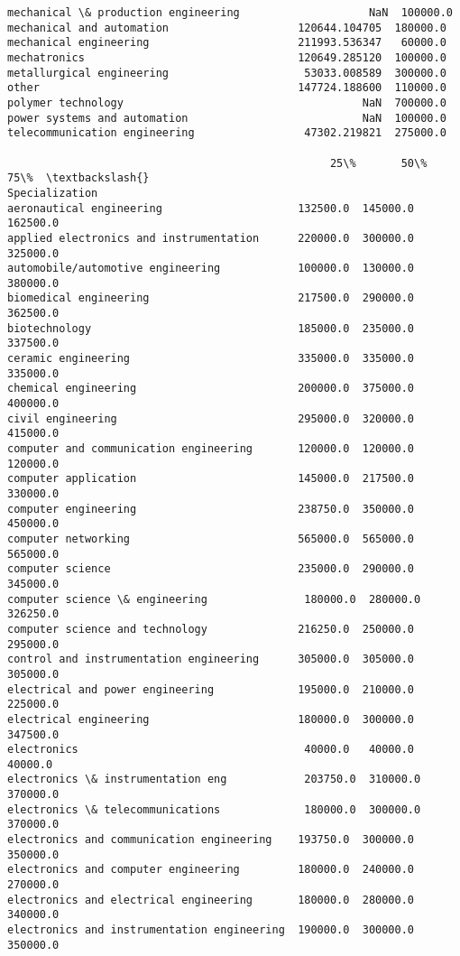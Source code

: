 \documentclass[11pt]{article}
\begin{document}
\begin{tcolorbox}[breakable, size=fbox, boxrule=.5pt, pad at break*=1mm, opacityfill=0]
\begin{Verbatim}[commandchars=\\\{\}]
mechanical \& production engineering                    NaN  100000.0
mechanical and automation                    120644.104705  180000.0
mechanical engineering                       211993.536347   60000.0
mechatronics                                 120649.285120  100000.0
metallurgical engineering                     53033.008589  300000.0
other                                        147724.188600  110000.0
polymer technology                                     NaN  700000.0
power systems and automation                           NaN  100000.0
telecommunication engineering                 47302.219821  275000.0

                                                  25\%       50\%       75\%  \textbackslash{}
Specialization
aeronautical engineering                     132500.0  145000.0  162500.0
applied electronics and instrumentation      220000.0  300000.0  325000.0
automobile/automotive engineering            100000.0  130000.0  380000.0
biomedical engineering                       217500.0  290000.0  362500.0
biotechnology                                185000.0  235000.0  337500.0
ceramic engineering                          335000.0  335000.0  335000.0
chemical engineering                         200000.0  375000.0  400000.0
civil engineering                            295000.0  320000.0  415000.0
computer and communication engineering       120000.0  120000.0  120000.0
computer application                         145000.0  217500.0  330000.0
computer engineering                         238750.0  350000.0  450000.0
computer networking                          565000.0  565000.0  565000.0
computer science                             235000.0  290000.0  345000.0
computer science \& engineering               180000.0  280000.0  326250.0
computer science and technology              216250.0  250000.0  295000.0
control and instrumentation engineering      305000.0  305000.0  305000.0
electrical and power engineering             195000.0  210000.0  225000.0
electrical engineering                       180000.0  300000.0  347500.0
electronics                                   40000.0   40000.0   40000.0
electronics \& instrumentation eng            203750.0  310000.0  370000.0
electronics \& telecommunications             180000.0  300000.0  370000.0
electronics and communication engineering    193750.0  300000.0  350000.0
electronics and computer engineering         180000.0  240000.0  270000.0
electronics and electrical engineering       180000.0  280000.0  340000.0
electronics and instrumentation engineering  190000.0  300000.0  350000.0

\end{Verbatim}
\end{tcolorbox}
\end{document}
